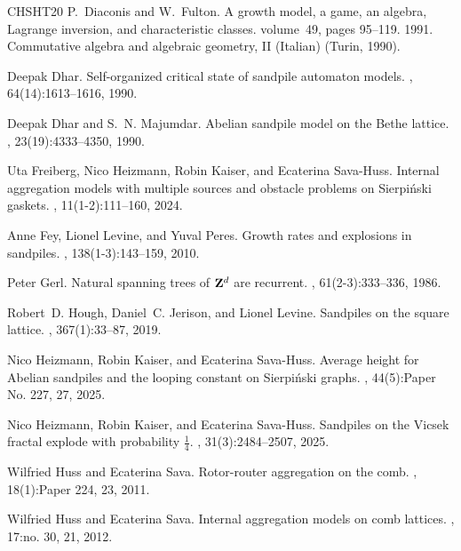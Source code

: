 \documentclass[11pt]{article}
\begin{document}
\begin{thebibliography}{CHSHT20}
P.~Diaconis and W.~Fulton.
\newblock A growth model, a game, an algebra, {L}agrange inversion, and characteristic classes.
\newblock volume~49, pages 95--119. 1991.
\newblock Commutative algebra and algebraic geometry, II (Italian) (Turin, 1990).

Deepak Dhar.
\newblock Self-organized critical state of sandpile automaton models.
, 64(14):1613--1616, 1990.

Deepak Dhar and S.~N. Majumdar.
\newblock Abelian sandpile model on the {B}ethe lattice.
, 23(19):4333--4350, 1990.

Uta Freiberg, Nico Heizmann, Robin Kaiser, and Ecaterina Sava-Huss.
\newblock Internal aggregation models with multiple sources and obstacle problems on {S}ierpi\'nski gaskets.
, 11(1-2):111--160, 2024.

Anne Fey, Lionel Levine, and Yuval Peres.
\newblock Growth rates and explosions in sandpiles.
, 138(1-3):143--159, 2010.

Peter Gerl.
\newblock Natural spanning trees of {${\bf Z}^d$} are recurrent.
, 61(2-3):333--336, 1986.

Robert~D. Hough, Daniel~C. Jerison, and Lionel Levine.
\newblock Sandpiles on the square lattice.
, 367(1):33--87, 2019.

Nico Heizmann, Robin Kaiser, and Ecaterina Sava-Huss.
\newblock Average height for {A}belian sandpiles and the looping constant on {S}ierpi\'nski graphs.
, 44(5):Paper No. 227, 27, 2025.

Nico Heizmann, Robin Kaiser, and Ecaterina Sava-Huss.
\newblock Sandpiles on the {V}icsek fractal explode with probability {$\frac 14$}.
, 31(3):2484--2507, 2025.

Wilfried Huss and Ecaterina Sava.
\newblock Rotor-router aggregation on the comb.
, 18(1):Paper 224, 23, 2011.

Wilfried Huss and Ecaterina Sava.
\newblock Internal aggregation models on comb lattices.
, 17:no. 30, 21, 2012.


\end{thebibliography}
\end{document}
